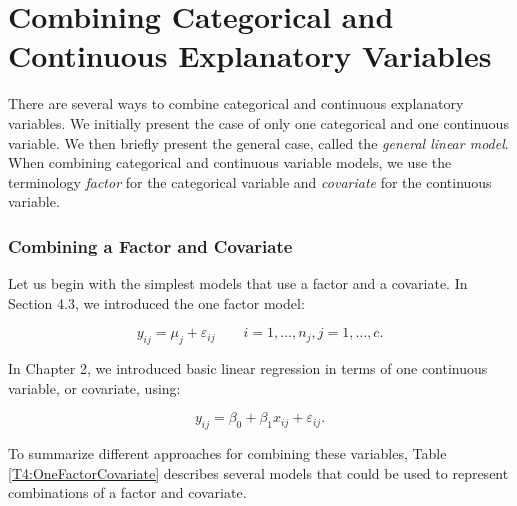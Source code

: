 \section{Combining Categorical and Continuous Explanatory Variables}

There are several ways to combine categorical and continuous
explanatory variables. We initially present the case of only one
categorical and one continuous variable. We then briefly present the
general case, called the \textit{general linear model}. When
combining categorical and continuous variable models, we use the
terminology \emph{factor} for the categorical variable and
\emph{covariate} for the continuous variable.

\subsubsection*{Combining a Factor and Covariate}

Let us begin with the simplest models that use a factor and a
covariate. In Section 4.3, we introduced the one factor model:

\begin{equation*}
y_{ij}=\mu _{j} + \varepsilon_{ij}\qquad i=1,\ldots ,n_{j},\text{
}j=1,\ldots ,c.
\end{equation*}

In Chapter 2, we introduced basic linear regression in terms of one
continuous variable, or covariate, using:

\begin{equation*}
y_{ij}=\beta _{0}+\beta _{1}x_{ij} + \varepsilon_{ij}.
\end{equation*}

\noindent To summarize different approaches for combining these
variables, Table \ref{T4:OneFactorCovariate} describes several
models that could be used to represent combinations of a factor and
covariate.


